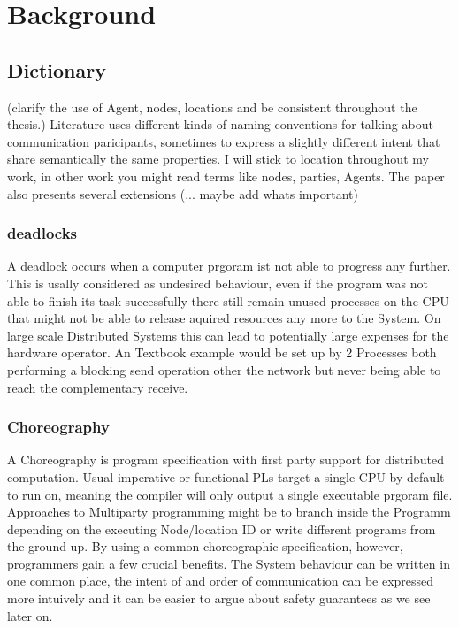\chapter{Background}
\label{ch:abstract}
\section{Dictionary}

(clarify the use of Agent, nodes, locations and be consistent throughout the thesis.)
Literature uses different kinds of naming conventions for talking about communication paricipants, sometimes to express a slightly different intent that share semantically the same properties. I will stick to location throughout my work, in other work you might read terms like nodes, parties, Agents. The paper also presents several extensions (... maybe add whats important)

\subsection{deadlocks}
A deadlock occurs when a computer prgoram ist not able to progress any further. This is usally considered as undesired behaviour, even if the program was not able to finish its task successfully there still remain unused processes on the CPU that might not be able to release aquired resources any more to the System. On large scale Distributed Systems this can lead to potentially large expenses for the hardware operator. An Textbook example would be set up by 2 Processes both performing a blocking send operation other the network but never being able to reach the complementary receive.
\subsection{Choreography}
A Choreography is program specification with first party support for distributed computation. Usual imperative or functional PLs target a single CPU by default to run on, meaning the compiler will only output a single executable prgoram file. Approaches to Multiparty programming might be to branch inside the Programm depending on the executing Node/location ID or write different programs from the ground up.
By using a common choreographic specification, however, programmers gain a few crucial benefits. The System behaviour can be written in one common place, the intent of and order of communication can be expressed more intuively and it can be easier to argue about safety guarantees as we see later on.

